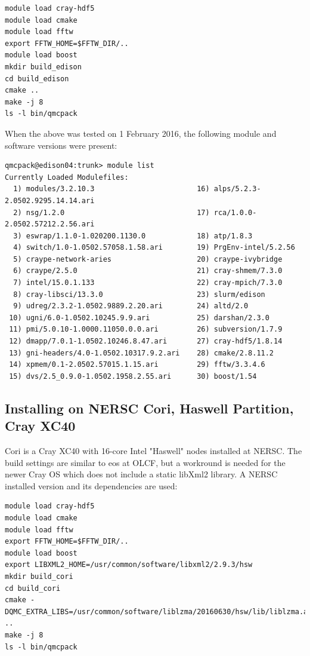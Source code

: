 \begin{verbatim}
module load cray-hdf5
module load cmake
module load fftw
export FFTW_HOME=$FFTW_DIR/..
module load boost
mkdir build_edison
cd build_edison
cmake ..
make -j 8
ls -l bin/qmcpack
\end{verbatim}
When the above was tested on 1 February 2016, the following module and
software versions were present:
\begin{verbatim}
qmcpack@edison04:trunk> module list
Currently Loaded Modulefiles:
  1) modules/3.2.10.3                        16) alps/5.2.3-2.0502.9295.14.14.ari
  2) nsg/1.2.0                               17) rca/1.0.0-2.0502.57212.2.56.ari
  3) eswrap/1.1.0-1.020200.1130.0            18) atp/1.8.3
  4) switch/1.0-1.0502.57058.1.58.ari        19) PrgEnv-intel/5.2.56
  5) craype-network-aries                    20) craype-ivybridge
  6) craype/2.5.0                            21) cray-shmem/7.3.0
  7) intel/15.0.1.133                        22) cray-mpich/7.3.0
  8) cray-libsci/13.3.0                      23) slurm/edison
  9) udreg/2.3.2-1.0502.9889.2.20.ari        24) altd/2.0
 10) ugni/6.0-1.0502.10245.9.9.ari           25) darshan/2.3.0
 11) pmi/5.0.10-1.0000.11050.0.0.ari         26) subversion/1.7.9
 12) dmapp/7.0.1-1.0502.10246.8.47.ari       27) cray-hdf5/1.8.14
 13) gni-headers/4.0-1.0502.10317.9.2.ari    28) cmake/2.8.11.2
 14) xpmem/0.1-2.0502.57015.1.15.ari         29) fftw/3.3.4.6
 15) dvs/2.5_0.9.0-1.0502.1958.2.55.ari      30) boost/1.54
\end{verbatim}

\subsection{Installing on NERSC Cori, Haswell Partition, Cray XC40}
Cori is a Cray XC40 with 16-core Intel "Haswell" nodes
installed at NERSC. The build settings are similar to eos at OLCF, but
a workround is needed for the newer Cray OS which does not include a static
libXml2 library. A NERSC installed version and its dependencies are used:

\begin{verbatim}
module load cray-hdf5
module load cmake
module load fftw
export FFTW_HOME=$FFTW_DIR/..
module load boost
export LIBXML2_HOME=/usr/common/software/libxml2/2.9.3/hsw
mkdir build_cori
cd build_cori
cmake -DQMC_EXTRA_LIBS=/usr/common/software/liblzma/20160630/hsw/lib/liblzma.a ..
make -j 8
ls -l bin/qmcpack
\end{verbatim}

